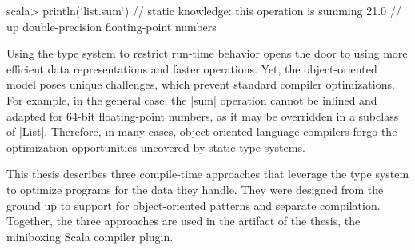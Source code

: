 \begin{lstlisting-nobreak}
 scala> println(`list.sum`) // static knowledge: this operation is summing
 21.0                             // up double-precision floating-point numbers
\end{lstlisting-nobreak}

Using the type system to restrict run-time behavior opens the door to using more efficient data representations and faster operations. Yet, the object-oriented model poses unique challenges, which prevent standard compiler optimizations. For example, in the general case, the |sum| operation cannot be inlined and adapted for 64-bit floating-point numbers, as it may be overridden in a subclass of |List|. Therefore, in many cases, object-oriented language compilers forgo the optimization opportunities uncovered by static type systems.

This thesis describes three compile-time approaches that leverage the type system to optimize programs for the data they handle. They were designed from the ground up to support for object-oriented patterns and separate compilation. Together, the three approaches are used in the artifact of the thesis, the miniboxing Scala compiler plugin.


%
%

